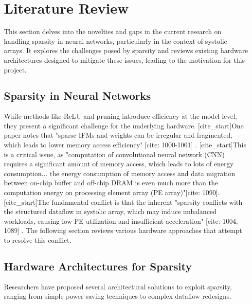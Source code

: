\section{Literature Review} \label{sec: literature review}

    This section delves into the novelties and gaps in the current research on handling sparsity in neural networks, particularly in the context of systolic arrays. It explores the challenges posed by sparsity and reviews existing hardware architectures designed to mitigate these issues, leading to the motivation for this project.

    \subsection{Sparsity in Neural Networks} \label{sec: sparsity in nn}

    While methods like ReLU and pruning introduce efficiency at the model level, they present a significant challenge for the underlying hardware. [cite_start]One paper notes that "sparse IFMs and weights can be irregular and fragmented, which leads to lower memory access efficiency" [cite: 1000-1001] \cite{sun_sense_2023}. [cite_start]This is a critical issue, as "computation of convolutional neural network (CNN) requires a significant amount of memory access, which leads to lots of energy consumption... the energy consumption of memory access and data migration between on-chip buffer and off-chip DRAM is even much more than the computation energy on processing element array (PE array)"[cite: 1090]. [cite_start]The fundamental conflict is that the inherent "sparsity conflicts with the structured dataflow in systolic array, which may induce imbalanced workloads, causing low PE utilization and insufficient acceleration" [cite: 1004, 1089] \cite{sun_sense_2023}. The following section reviews various hardware approaches that attempt to resolve this conflict.


    \subsection{Hardware Architectures for Sparsity} \label{sec: hardware arch spars}
    Researchers have proposed several architectural solutions to exploit sparsity, ranging from simple power-saving techniques to complex dataflow redesigns.

